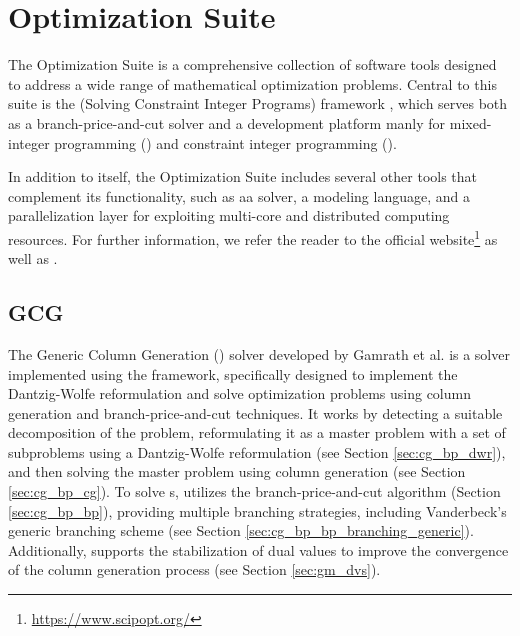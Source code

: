 \chapter{\SCIP{} Optimization Suite}\label{ch:tools}
The \SCIP{} Optimization Suite is a comprehensive collection of software tools designed to address a wide range of mathematical optimization problems. Central to this suite is the \SCIP{} (Solving Constraint Integer Programs) framework \cite{achterberg2007constraint, achterberg2009scip}, which serves both as a branch-price-and-cut solver and a development platform manly for mixed-integer programming (\MIP{}) and constraint integer programming (\CIP{}).

In addition to \SCIP{} itself, the \SCIP{} Optimization Suite includes several other tools that complement its functionality, such as aa \LP{} solver, a modeling language, and a parallelization layer for exploiting multi-core and distributed computing resources. For further information, we refer the reader to the official \SCIP{} website\footnote{\url{https://www.scipopt.org/}} as well as \cite{bolusani2024scip}.

\section{GCG}\label{sec:tools_gcg}
The Generic Column Generation (\GCG{}) solver developed by Gamrath et al. \cite{gamrath2010generic} is a solver implemented using the \SCIP{} framework, specifically designed to implement the Dantzig-Wolfe reformulation and solve optimization problems using column generation and branch-price-and-cut techniques. It works by detecting a suitable decomposition of the problem, reformulating it as a master problem with a set of subproblems using a Dantzig-Wolfe reformulation (see Section \ref{sec:cg_bp_dwr}), and then solving the master problem using column generation (see Section \ref{sec:cg_bp_cg}). To solve \MIP{}s, \GCG{} utilizes the branch-price-and-cut algorithm (Section \ref{sec:cg_bp_bp}), providing multiple branching strategies, including Vanderbeck's generic branching scheme (see Section \ref{sec:cg_bp_bp_branching_generic}). Additionally, \GCG{} supports the stabilization of dual values to improve the convergence of the column generation process (see Section \ref{sec:gm_dvs}).
